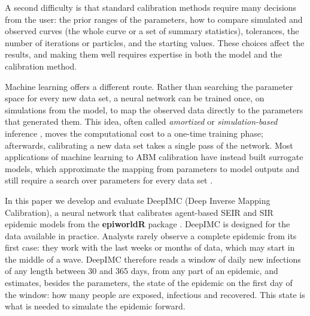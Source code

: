 \documentclass[12pt]{article}
\begin{document}
A second difficulty is that standard calibration methods require many decisions from the user:
the prior ranges of the parameters, how to compare simulated and observed curves (the whole curve
or a set of summary statistics), tolerances, the number of iterations or particles, and the
starting values. These choices affect the results, and making them well requires expertise in
both the model and the calibration method.

Machine learning offers a different route. Rather than searching the parameter space for every new
data set, a neural network can be trained once, on simulations from the model, to map the observed
data directly to the parameters that generated them. This idea, often called \emph{amortized} or
\emph{simulation-based} inference \autocite{cranmer2020frontier,radev2022bayesflow}, moves the
computational cost to a one-time training phase; afterwards, calibrating a new data set takes a
single pass of the network. Most applications of machine learning to ABM calibration have instead
built surrogate models, which approximate the mapping from parameters to model outputs and still
require a search over parameters for every data set
\autocite{Angione2022-surrogate,lamperti2017agentbasedmodelcalibrationusing}.

In this paper we develop and evaluate DeepIMC (Deep Inverse Mapping Calibration), a neural network
that calibrates agent-based SEIR and SIR epidemic models from the \textbf{epiworldR} package
\autocite{meyerEpiworldRFastAgentBased2023}. DeepIMC is designed for the data available in
practice. Analysts rarely observe a complete epidemic from its first case: they work with the last
weeks or months of data, which may start in the middle of a wave. DeepIMC therefore reads a window
of daily new infections of any length between 30 and 365 days, from any part of an epidemic, and
estimates, besides the parameters, the state of the epidemic on the first day of the window: how
many people are exposed, infectious and recovered. This state is what is needed to simulate the
epidemic forward.
\end{document}
